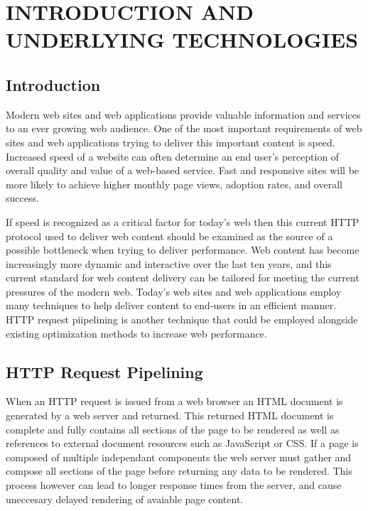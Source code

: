 \documentclass[12pt]{report}
\begin{document}
\chapter{INTRODUCTION AND UNDERLYING TECHNOLOGIES}

\section{Introduction}
Modern web sites and web applications provide valuable information and services to an ever growing web audience. One of the most important requirements of web sites and web applications trying to deliver this important content is speed. Increased speed of a website can often determine an end user's perception of overall quality and value of a web-based service. Fast and responsive sites will be more likely to achieve higher monthly page views, adoption rates, and overall success.

If speed is recognized as a critical factor for today's web then this current HTTP protocol used to deliver web content should be examined as the source of a possible bottleneck when trying to deliver performance. Web content has become increasingly more dynamic and interactive over the last ten years, and this current standard for web content delivery can be tailored for meeting the current pressures of the modern web. Today's web sites and web applications employ many techniques to help deliver content to end-users in an efficient manner. HTTP request piipelining is another technique that could be employed alongside existing optimization methods to increase web performance.

\section{HTTP Request Pipelining}

 When an HTTP request is issued from a web browser an HTML document is generated by a web server and returned. This returned HTML document is complete and fully contains all sections of the page to be rendered as well as references to external document resources such as JavaScript or CSS. If a page is composed of multiple independant components the web server must gather and compose all sections of the page before returning any data to be rendered. This process however can lead to longer response times from the server, and cause uneccesary delayed rendering of avaiable page content.
\end{document}
